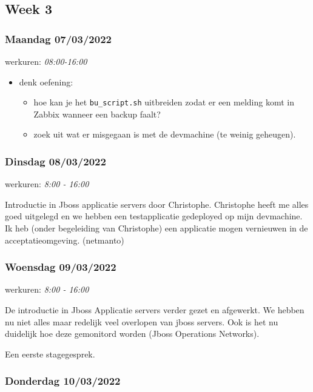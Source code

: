 \subsection{Week 3}

\subsubsection{Maandag 07/03/2022}

werkuren: \emph{08:00-16:00}

\begin{itemize}
    \item denk oefening:    
    \begin{itemize}
        \item hoe kan je het \texttt{bu\_script.sh} uitbreiden zodat er een melding komt in Zabbix wanneer een backup faalt?
        \item zoek uit wat er misgegaan is met de devmachine (te weinig geheugen).
    \end{itemize}
\end{itemize}

\subsubsection{Dinsdag 08/03/2022}

werkuren: \emph{8:00 - 16:00}

Introductie in Jboss applicatie servers door Christophe. Christophe
heeft me alles goed uitgelegd en we hebben een testapplicatie gedeployed
op mijn devmachine. Ik heb (onder begeleiding van Christophe) een
applicatie mogen vernieuwen in de acceptatieomgeving. (netmanto)

\subsubsection{Woensdag 09/03/2022}

werkuren: \emph{8:00 - 16:00}

De introductie in Jboss Applicatie servers verder gezet en afgewerkt. We
hebben nu niet alles maar redelijk veel overlopen van jboss servers. Ook
is het nu duidelijk hoe deze gemonitord worden (Jboss Operations
Networks).

Een eerste stagegesprek.

\subsubsection{Donderdag 10/03/2022}

